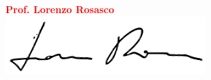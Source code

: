 \documentclass{beamer}%
\begin{document}
\begin{frame}



                    \begin{columns}
                    \begin{block}{}
                    \end{block}

                    \begin{block}{}
                    \raggedleft\textcolor{red}{\textbf{Prof. Lorenzo Rosasco}}\\
                    \raggedleft\includegraphics[scale=0.5]{Figures/rosasco_sign}
                    \end{block}
                    \end{columns}
\end{frame}
%
\end{document}
